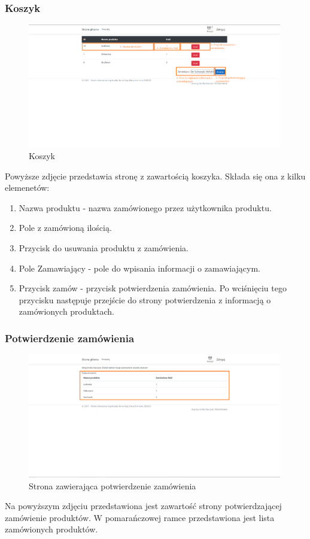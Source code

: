 \documentclass{article}
\begin{document}
\subsubsection{Koszyk}
\begin{figure}[H]
   \centering
   \includegraphics[width=0.99\textwidth,frame]{Wyglad/koszyk_uzytkownik.png}
   \caption{Koszyk}
\end{figure}
Powyższe zdjęcie przedstawia stronę z zawartością koszyka. Składa się ona z kilku elemenetów:
\begin{enumerate}
   \item Nazwa produktu - nazwa zamówionego przez użytkownika produktu.
   \item Pole z zamówioną ilością.
   \item Przycisk do usuwania produktu z zamówienia. 
   \item Pole Zamawiający - pole do wpisania informacji o zamawiającym.
   \item Przycisk zamów - przycisk potwierdzenia zamówienia. Po wciśnięciu tego przycisku następuje
   przejście do strony potwierdzenia z informacją o zamówionych produktach.
\end{enumerate} 

\subsubsection{Potwierdzenie zamówienia}
\begin{figure}[H]
   \centering
   \includegraphics[width=0.99\textwidth,frame]{Wyglad/zlozenie_zamowienia_uzytkownik.png}
   \caption{Strona zawierająca potwierdzenie zamówienia}
\end{figure}
Na powyższym zdjęciu przedstawiona jest zawartość strony potwierdzającej zamówienie produktów. W
pomarańczowej ramce przedstawiona jest lista zamówionych produktów.
\end{document}
